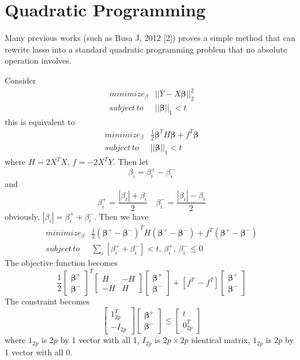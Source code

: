 \documentclass{article} %
\begin{document}
\section{Quadratic Programming}
Many previous works (such as Busa J, 2012 [2]) proves a simple method that can rewrite lasso into a standard quadratic programming problem that no absolute operation involves.

Consider $$ \begin{array}{ll}
	minimize_\beta &||Y-X\bm{\beta}||_2^2\\
	subject\, to & ||\bm{\beta}||_1 < t
\end{array}
$$
this is equivalent to $$ \begin{array}{ll}
minimize_\beta &\frac{1}{2}\bm{\beta}^TH\bm{\beta}+f^T\bm{\beta}\\
subject\, to & ||\bm{\beta}||_1 < t
\end{array}
$$where $H=2X^TX$, $f=-2X^TY$. Then let \[
\beta_i=\beta_i^+-\beta^-_i
\] and\[
\beta_i^+=\frac{|\beta_i|+\beta_i}{2}\quad \beta_i^-=\frac{|\beta_i|-\beta_i}{2}
\]
obviously, $|\beta_i|=\beta_i^++\beta^-_i$. Then we have $$ \begin{array}{ll}
minimize_\beta &\frac{1}{2}(\bm{\beta}^+-\bm{\beta}^-)^TH(\bm{\beta}^+-\bm{\beta}^-)+f^T(\bm{\beta}^+-\bm{\beta}^-)\\
subject\, to & \sum_i[\beta_i^++\beta^-_i] < t, \, \beta_i^+,\,\beta^-_i\le0
\end{array}
$$
The objective function becomes
$$\frac{1}{2} \left[\begin{array}{l}
\bm{\beta}^+\\\bm{\beta}^-
\end{array}\right]^T\left[\begin{array}{ll}
H &-H\\
-H & H
\end{array}\right]\left[\begin{array}{l}
\bm{\beta}^+\\\bm{\beta}^-
\end{array}\right]+\left[f^T \,-f^T\right]\left[\begin{array}{l}
\bm{\beta}^+\\\bm{\beta}^-
\end{array}\right]
$$The constraint becomes
\[
\left[\begin{array}{l}
1_{2p}^T\\
-I_{2p}
\end{array}\right]\left[\begin{array}{l}
\bm{\beta}^+\\\bm{\beta}^-
\end{array}\right] \le \left[\begin{array}{l}
t\\
0_{2p}^T\end{array}\right]
\]where $1_{2p}$ is $2p$ by 1 vector with all 1, $I_{2p}$ is $2p\times2p$ identical matrix, $1_{2p}$ is $2p$ by 1 vector with all 0.
\end{document}
